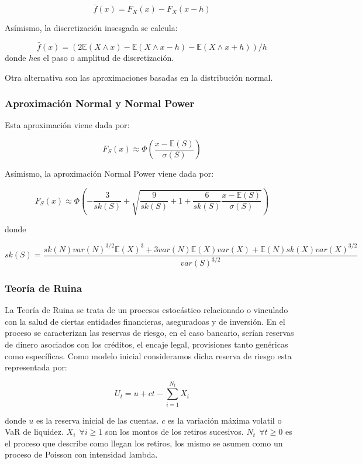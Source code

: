 \documentclass[10pt,]{article}
\begin{document}
\[\bar{f}(x)=F_X(x)-F_X(x-h)\]

Asímismo, la discretización insesgada se calcula:

\[\bar{f}(x)=(2\mathbb{E}(X\wedge x)-\mathbb{E}(X\wedge x-h)-\mathbb{E}(X \wedge x+h))/h\]
donde \(h\)es el paso o amplitud de discretización.

Otra alternativa son las aproximaciones basadas en la distribución
normal.

\hypertarget{aproximacion-normal-y-normal-power}{%
\subsubsection{Aproximación Normal y Normal
Power}\label{aproximacion-normal-y-normal-power}}

Esta aproximación viene dada por:

\[F_S(x) \approx \Phi\left(\frac{x-\mathbb{E}(S)}{\sigma(S)}\right)\]

Asímismo, la aproximación Normal Power viene dada por:

\[F_S(x) \approx \Phi\left(-\frac{3}{sk(S)}+\sqrt{\frac{9}{sk(S)}+1+\frac{6}{sk(S)}\frac{x-\mathbb{E}(S)}{\sigma(S)}}\right)\]

donde

\[sk(S)=\frac{sk(N)var(N)^{3/2}\mathbb{E}(X)^3+3var(N)\mathbb{E}(X)var(X)+ \mathbb{E}(N)sk(X)var(X)^{3/2}}{var(S)^{3/2}}\]

\hypertarget{teoria-de-ruina}{%
\subsubsection{Teoría de Ruina}\label{teoria-de-ruina}}

La Teoría de Ruina se trata de un procesos estocástico relacionado o
vinculado con la salud de ciertas entidades financieras, aseguradoas y
de inversión. En el proceso se caracterizan las reservas de riesgo, en
el caso bancario, serían reservas de dinero asociados con los créditos,
el encaje legal, provisiones tanto genéricas como específicas. Como
modelo inicial consideramos dicha reserva de riesgo esta representada
por:

\[U_t=u+ct-\sum_{i=1}^{N_t}X_i\]

donde \(u\) es la reserva inicial de las cuentas. \(c\) es la variación
máxima volatil o VaR de liquidez. \(X_i~~\forall i \geq1\) son los
montos de los retiros sucesivos. \(N_t~~\forall t \geq0\) es el proceso
que describe como llegan los retiros, los mismo se asumen como un
proceso de Poisson con intensidad lambda.
\end{document}
